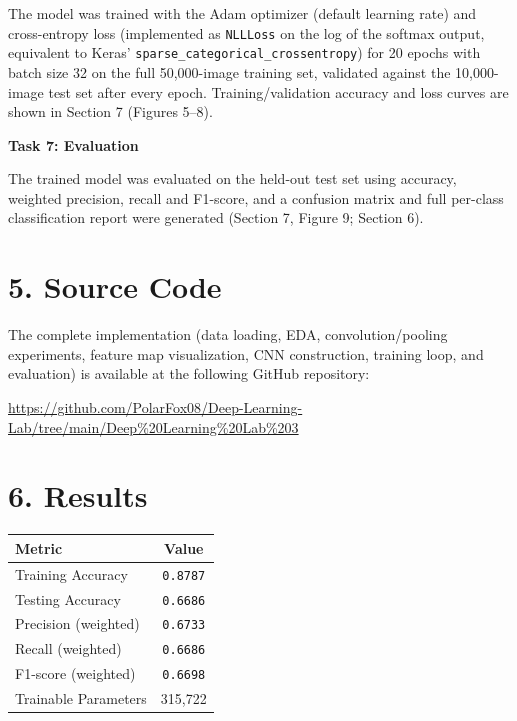 \documentclass[11pt]{article}
\begin{document}
The model was trained with the Adam optimizer (default learning rate) and cross-entropy loss (implemented as \texttt{NLLLoss} on the log of the softmax output, equivalent to Keras' \texttt{sparse\_categorical\_crossentropy}) for 20 epochs with batch size 32 on the full 50,000-image training set, validated against the 10,000-image test set after every epoch. Training/validation accuracy and loss curves are shown in Section 7 (Figures 5--8).

\bigskip

\textbf{Task 7: Evaluation}

The trained model was evaluated on the held-out test set using accuracy, weighted precision, recall and F1-score, and a confusion matrix and full per-class classification report were generated (Section 7, Figure 9; Section 6).

\section*{5. Source Code}
The complete implementation (data loading, EDA, convolution/pooling experiments, feature map visualization, CNN construction, training loop, and evaluation) is available at the following GitHub repository:

\begin{center}
\url{https://github.com/PolarFox08/Deep-Learning-Lab/tree/main/Deep%20Learning%20Lab%203}
\end{center}

\section*{6. Results}

\begin{center}
\begin{tabular}{|l|c|}
\hline
Metric & Value\\
\hline
Training Accuracy & \texttt{0.8787}\\
Testing Accuracy & \texttt{0.6686}\\
Precision (weighted) & \texttt{0.6733}\\
Recall (weighted) & \texttt{0.6686}\\
F1-score (weighted) & \texttt{0.6698}\\
Trainable Parameters & 315,722\\
\hline
\end{tabular}
\end{center}
\end{document}
